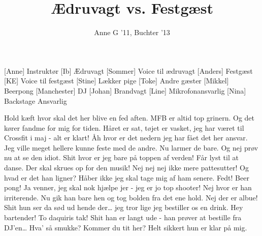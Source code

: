 \documentclass[a4paper,11pt]{article}
\title{Ædruvagt vs. Festgæst}
\author{Anne G '11, Buchter '13}
\begin{document}
\maketitle

\begin{roles}
[Anne] Instruktør
[Ib] Ædruvagt
[Sommer] Voice til ædruvagt
[Anders] Festgæst
[KE] Voice til festgæst
[Stine] Lækker pige
[Toke] Andre gæster
[Mikkel] Beerpong
[Manchester] DJ
[Johan] Brandvagt
[Line] Mikrofonansvarlig
[Nina] Backstage Ansvarlig
\end{roles}

\begin{sketch}
 Hold kæft hvor skal det her blive en fed aften. MFB er altid top grinern. Og det kører fandme for mig for tiden. Håret er sat, tøjet er vasket, jeg har været til Crossfit i maj - alt er klart!
 Åh hvor er det nedern jeg har fået det her ansvar. Jeg ville meget hellere kunne feste med de andre. Nu larmer de bare. Og nej prøv nu at se den idiot.
 Shit hvor er jeg bare på toppen af verden! Får lyst til at danse. Der skal skrues op for den musik!
 Nej nej nej ikke mere pattesutter! Og hvad er det han ligner? Håber ikke jeg skal tage mig af ham senere.
 Fedt! Beer pong! Ja venner, jeg skal nok hjælpe jer - jeg er jo top shooter!
 Nej hvor er han irriterende. Nu gik han bare hen og tog bolden fra det ene hold. Nej der er albue!
 Shit hun ser da sød ud hende der… jeg tror lige jeg bestiller os en drink. Hey bartender! To daquiris tak!
 Shit han er langt ude - han prøver at bestille fra DJ’en…
 Hva’ så smukke? Kommer du tit her? Helt sikkert hun er klar på mig.

\end{sketch}
\end{document}
